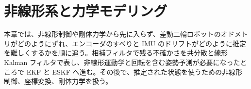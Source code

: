 \section{非線形系と力学モデリング}

本章では、非線形制御や剛体力学から先に入らず、差動二輪ロボットのオドメトリがどのようにずれ、エンコーダのすべりと IMU のドリフトがどのように推定を難しくするかを順に追う。相補フィルタで残る不確かさを共分散と線形 Kalman フィルタで表し、非線形運動学と回転を含む姿勢予測が必要になったところで EKF と ESKF へ進む。その後で、推定された状態を使うための非線形制御、座標変換、剛体力学を扱う。











